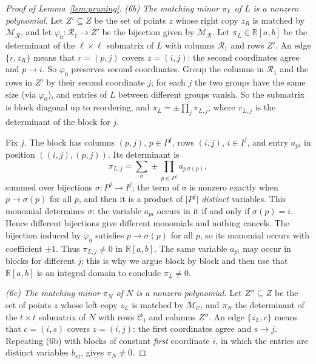 \documentclass[11pt]{article}
\theoremstyle{remark}
\newcommand{\abs}[1]{\lvert #1\rvert}
\newcommand{\R}{\mathbb R}
\newcommand{\cR}{\mathcal R}
\newcommand{\cC}{\mathcal C}
\newcommand{\cM}{\mathcal M}
\begin{document}
\begin{proof}[Proof of Lemma~\ref{lem:pruning}]
\smallskip\noindent\emph{(6b) The matching minor $\pi_L$ of $L$ is a
nonzero polynomial.} Let $Z'\subseteq Z$ be the set of points $z$ whose
right copy $z_R$ is matched by $\cM_{\cR}$, and let
$\varphi_0:\cR_1\to Z'$ be the bijection given by $\cM_{\cR}$. Let
$\pi_L\in\R[a,b]$ be the determinant of
the $\ell\times\ell$ submatrix of $L$ with columns $\cR_1$ and rows
$Z'$. An edge $\{r,z_R\}$ means that $r=(p,j)$ covers $z=(i,j)$: the
second coordinates agree and $p\to i$. So $\varphi_0$ preserves second
coordinates. Group the columns in $\cR_1$ and the rows in $Z'$ by
their second coordinate $j$; for each $j$ the two groups have the same size
(via $\varphi_0$), and entries of $L$ between different groups vanish. So
the submatrix is block diagonal up to reordering, and
$\pi_L=\pm\prod_j\pi_{L,j}$, where $\pi_{L,j}$ is the determinant of the
block for $j$.

Fix $j$. The block has columns $(p,j)$, $p\in P^j$, rows $(i,j)$,
$i\in I^j$, and entry $a_{pi}$ in position $((i,j),(p,j))$. Its determinant
is
\[
 \pi_{L,j}=\sum_{\sigma}\pm\prod_{p\in P^j}a_{p\,\sigma(p)},
\]
summed over bijections $\sigma:P^j\to I^j$; the term of $\sigma$ is nonzero
exactly when $p\to\sigma(p)$ for all $p$, and then it is a product of
$\abs{P^j}$ \emph{distinct} variables. This monomial determines $\sigma$:
the variable $a_{pi}$ occurs in it if and only if $\sigma(p)=i$. Hence
different bijections give different monomials and nothing cancels. The
bijection induced by $\varphi_0$ satisfies $p\to\sigma(p)$ for all $p$, so
its monomial occurs with coefficient $\pm1$. Thus $\pi_{L,j}\ne0$ in
$\R[a,b]$. The same variable $a_{pi}$ may occur in blocks for different $j$;
this is why we argue block by block and then use that $\R[a,b]$ is an
integral domain to conclude $\pi_L\ne0$.

\smallskip\noindent\emph{(6c) The matching minor $\pi_N$ of $N$ is a
nonzero polynomial.} Let $Z''\subseteq Z$ be the set of points $z$ whose
left copy $z_L$ is matched by $\cM_{\cC}$, and $\pi_N$ the determinant of the
$t\times t$ submatrix of $N$ with rows $\cC_1$ and columns $Z''$. An
edge $\{z_L,c\}$ means that $c=(i,s)$ covers $z=(i,j)$: the first coordinates
agree and $s\to j$. Repeating (6b) with blocks of constant \emph{first}
coordinate $i$, in which the entries are distinct variables $b_{sj}$, gives
$\pi_N\ne0$.


\end{proof}
\end{document}
